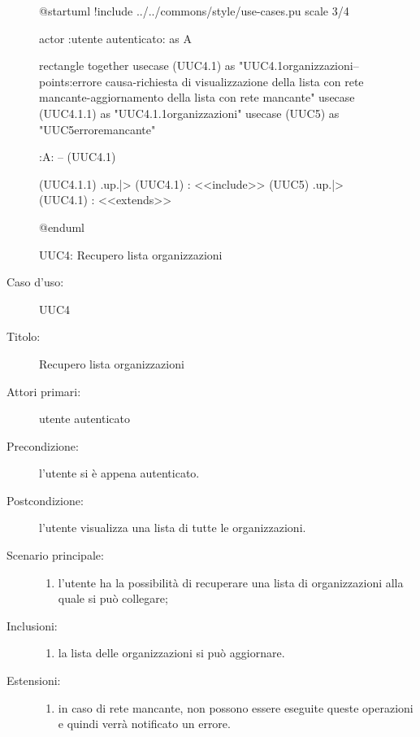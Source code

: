 \documentclass[casi-duso]{subfiles}
\begin{document}
\begin{figure}[h!] 
  \centering 
  \begin{plantuml}
  @startuml
  !include ../../commons/style/use-cases.pu
  scale 3/4

  actor :utente autenticato: as A

  rectangle {
    together {
      usecase (UUC4.1) as "UUC4.1\nVisualizzazione\nlista organizzazioni\n--\nExtension points:\nVisualizzazione errore causa\n-richiesta di visualizzazione della lista con rete mancante\n-aggiornamento della lista con rete mancante"
      usecase (UUC4.1.1) as "UUC4.1.1\nAggiornamento\nlista organizzazioni"
      usecase (UUC5) as "UUC5\nVisualizzazione errore\nrete mancante"
    }
  }

  :A: -- (UUC4.1)

  (UUC4.1.1) .up.|> (UUC4.1) : <<include>>
  (UUC5) .up.|> (UUC4.1) : <<extends>>

  @enduml
  \end{plantuml} 
  \caption{UUC4: Recupero lista organizzazioni} 
  \label{fig:uuc4} 
\end{figure}

\begin{description}
  \item[Caso d’uso:] UUC4
  \item[Titolo:] Recupero lista organizzazioni
  \item[Attori primari:] utente autenticato
  \item[Precondizione:] l'utente si è appena autenticato.
  \item[Postcondizione:] l'utente visualizza una lista di tutte le organizzazioni.
  \item[Scenario principale:]
        \begin{enumerate}
          \item l'utente ha la possibilità di recuperare una lista di organizzazioni alla quale si può collegare;
        \end{enumerate}
  \item[Inclusioni:]
        \begin{enumerate}
          \item la lista delle organizzazioni si può aggiornare.
        \end{enumerate}
  \item[Estensioni:]
        \begin{enumerate}
          \item in caso di rete mancante, non possono essere eseguite queste operazioni e quindi verrà notificato un errore.
        \end{enumerate}
\end{description}
\end{document}
